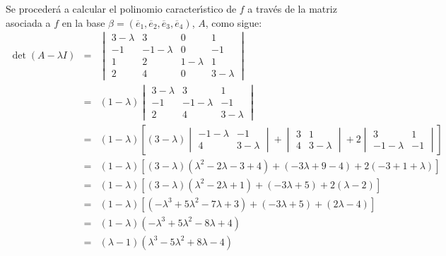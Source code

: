\begin{solucion}
 Se proceder\'a a calcular el polinomio caracter\'{\i}stico de $f$ a trav\'es de la matriz asociada a $f$ en la base $\beta = (\overline{e}_1, \overline{e}_2, \overline{e}_3, \overline{e}_4)$, $A$, como sigue:
 \begin{eqnarray*}
  \det(A-\lambda I) & = &
  \begin{vmatrix}
    3 - \lambda &  3           & 0     &          1           \\
   -1           & -1 - \lambda & 0     &          -1           \\
    1           &  2           & 1 - \lambda &  1           \\
    2           &  4           & 0     &          3 - \lambda 
  \end{vmatrix} \\
  & = & (1-\lambda)
  \begin{vmatrix}
    3 - \lambda &  3           &  1 \\
   -1           & -1 - \lambda & -1 \\
    2           &  4           &  3 - \lambda
  \end{vmatrix} \\ 
  & = & (1-\lambda)\left[ (3-\lambda)
  \begin{vmatrix}
   -1 - \lambda & -1           \\
    4           &  3 - \lambda
  \end{vmatrix}
  +
  \begin{vmatrix}
   3 & 1           \\
   4 & 3 - \lambda
  \end{vmatrix}
  + 2
  \begin{vmatrix}
    3           &  1 \\
   -1 - \lambda & -1
  \end{vmatrix}
  \right] \\
  & = & (1-\lambda)\left[ (3-\lambda)(\lambda^2 - 2 \lambda - 3 + 4) + (-3\lambda + 9 - 4) + 2(-3 + 1+\lambda) \right] \\ 
  & = & (1-\lambda)\left[ (3-\lambda)(\lambda^2 - 2\lambda +1 ) + (-3\lambda + 5) + 2(\lambda - 2) \right] \\
  & = & (1 - \lambda)\left[ (-\lambda^3 + 5\lambda^2 - 7\lambda + 3) + (-3\lambda + 5) + (2\lambda - 4) \right] \\
  & = & (1 - \lambda)(-\lambda^3 + 5\lambda^2 - 8\lambda + 4) \\
  & = & (\lambda - 1)(\lambda^3 - 5\lambda^2 + 8\lambda - 4) \\

\end{eqnarray*}
\end{solucion}
